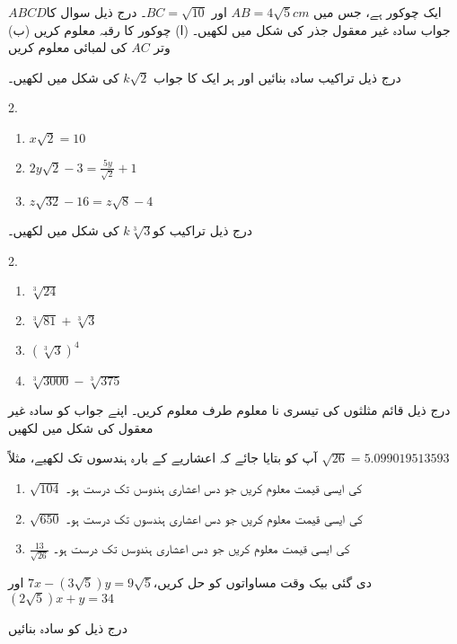 \(ABCD\)ایک چوکور ہے، جس میں \(AB=4\sqrt{5}cm\) اور \(BC=\sqrt{10}\)۔ درج ذیل سوال کا جواب سادہ غیر معقول جذر کی شکل میں  لکھیں۔
(ا) چوکور کا رقبہ معلوم کریں
(ب) وتر \(AC\) کی لمبائی معلوم کریں

درج ذیل تراکیب سادہ بنائیں اور ہر ایک کا جواب $k \sqrt{2}$  کی شکل میں لکھیں۔
\begin{multicols}{2.}
\begin{enumerate}
\item
\(x\sqrt{2}=10\)
\item
\(2y\sqrt{2}-3=\frac{5y}{\sqrt{2}}+1\)
\item
\(z\sqrt{32}-16=z\sqrt{8}-4\)
\end{enumerate}
\end{multicols}

درج ذیل تراکیب  کو\(k\sqrt[3]{3}\) کی شکل میں لکھیں۔

\begin{multicols}{2.}
\begin{enumerate}
\item
\(\sqrt[3]{24}\)
\item
\(\sqrt[3]{81}+\sqrt[3]{3}\)
\item
\((\sqrt[3]{3})^{4}\)
\item
\(\sqrt[3]{3000}-\sqrt[3]{375}\)
\end{enumerate}
\end{multicols}
درج ذیل قائم مثلثوں کی تیسری نا معلوم طرف معلوم کریں۔ اپنے جواب کو سادہ غیر معقول کی شکل میں لکھیں


آپ کو بتایا جائے کہ اعشاریے کے بارہ ہندسوں تک لکھیے، مثلاً \(\sqrt{26}=\num{5.099019513593}\)
\begin{enumerate}
\item
\(\sqrt{104}\) کی ایسی قیمت معلوم کریں جو دس اعشاری ہندوسں تک درست ہو۔
\item
\(\sqrt{650}\) کی ایسی قیمت معلوم کریں جو دس اعشاری ہندسوں تک درست ہو۔
\item
\(\frac{13}{\sqrt{26}}\) کی ایسی قیمت معلوم کریں جو دس اعشاری ہندوسں تک درست ہو۔
\end{enumerate}

دی گئی بیک وقت مساواتوں کو حل کریں،\(7x-(3\sqrt{5})y=9\sqrt{5}\) اور \((2\sqrt{5})x+y=34\)

درج ذیل کو سادہ بنائیں


